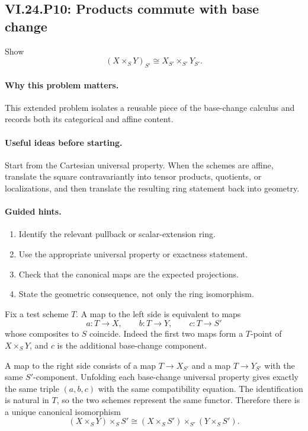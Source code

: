 \subsection*{VI.24.P10: Products commute with base change}
\begin{problem}\label{prob:vi24-p10}
Show
\[
(X\times_SY)_{S'}\cong X_{S'}\times_{S'}Y_{S'}.
\]
\end{problem}

\ifdefined\FullProblemDossiers
\paragraph{Why this problem matters.}
This extended problem isolates a reusable piece of the base-change calculus and records both its categorical and affine content.

\paragraph{Useful ideas before starting.}
Start from the Cartesian universal property.  When the schemes are affine, translate the square contravariantly into tensor products, quotients, or localizations, and then translate the resulting ring statement back into geometry.

\paragraph{Guided hints.}
\begin{enumerate}
\item Identify the relevant pullback or scalar-extension ring.
\item Use the appropriate universal property or exactness statement.
\item Check that the canonical maps are the expected projections.
\item State the geometric consequence, not only the ring isomorphism.
\end{enumerate}

\begin{solution}
Fix a test scheme $T$.  A map to the left side is equivalent to maps
\[
a:T\to X,
\qquad b:T\to Y,
\qquad c:T\to S'
\]
whose composites to $S$ coincide.  Indeed the first two maps form a $T$-point of $X\times_SY$, and $c$ is the additional base-change component.

A map to the right side consists of a map $T\to X_{S'}$ and a map $T\to Y_{S'}$ with the same $S'$-component.  Unfolding each base-change universal property gives exactly the same triple $(a,b,c)$ with the same compatibility equation.  The identification is natural in $T$, so the two schemes represent the same functor.  Therefore there is a unique canonical isomorphism
\[
(X\times_SY)\times_SS'\cong(X\times_SS')\times_{S'}(Y\times_SS').
\]
\end{solution}

